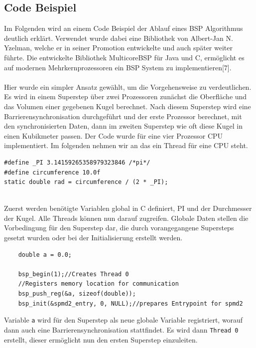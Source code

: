 \documentclass[a4paper,10pt]{scrartcl}
\begin{document}
\newpage

\subsection{Code Beispiel}
Im Folgenden wird an einem Code Beispiel der Ablauf eines BSP Algorithmus deutlich erklärt. Verwendet wurde dabei eine Bibliothek von Albert-Jan N. Yzelman, welche er in seiner Promotion entwickelte und auch später weiter führte. Die entwickelte Bibliothek MulticoreBSP für Java und C, ermöglicht es auf modernen Mehrkernprozessoren ein BSP System zu implementieren[7].\\\\
Hier wurde ein simpler Ansatz gewählt, um die Vorgehensweise zu verdeutlichen. Es wird in einem Superstep über zwei Prozessoren zunächst die Oberfläche und das Volumen einer gegebenen Kugel berechnet. Nach diesem Superstep wird eine Barrierensynchronisation durchgeführt und der erste Prozessor berechnet, mit den synchronisierten Daten, dann im zweiten Superstep wie oft diese Kugel in einen Kubikmeter passen. Der Code wurde für eine vier Prozessor CPU implementiert. Im folgenden nehmen wir an das ein Thread für eine CPU steht.\\
\begin{lstlisting}
#define _PI 3.14159265358979323846 /*pi*/
#define circumference 10.0f
static double rad = circumference / (2 * _PI);
   
\end{lstlisting}
Zuerst werden benötigte Variablen global in C definiert, PI und der Durchmesser der Kugel. Alle Threads können nun darauf zugreifen. Globale Daten stellen die Vorbedingung für den Superstep dar, die durch vorangegangene Supersteps gesetzt wurden oder bei der Initialisierung erstellt werden.

\begin{lstlisting}
    double a = 0.0;
    
    bsp_begin(1);//Creates Thread 0  
    //Registers memory location for communication  
    bsp_push_reg(&a, sizeof(double));   
    bsp_init(&spmd2_entry, 0, NULL);//prepares Entrypoint for spmd2    
\end{lstlisting}
Variable \texttt{a} wird für den Superstep als neue globale Variable registriert, worauf dann auch eine Barrierensynchronisation stattfindet. Es wird dann \texttt{Thread 0}  erstellt, dieser ermöglicht nun den ersten Superstep einzuleiten.
\end{document}
